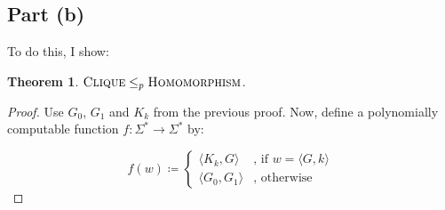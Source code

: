 \documentclass[a4paper,11pt]{scrartcl}
\newcommand{\encode}[1]{\langle #1 \rangle}
\newtheorem{theorem}{Theorem}
\begin{document}
\subsection*{Part (b)}
To do this, I show:
\begin{theorem}
    $\textsc{Clique} \leq_p \textsc{Homomorphism}$.
\end{theorem}
\begin{proof}
    Use $G_0$, $G_1$ and $K_k$ from the previous proof. Now, define a polynomially computable function $f : \Sigma^* \rightarrow \Sigma^*$ by:

    \[
        f(w) \coloneqq
        \begin{cases}
            \encode{K_k, G} & \text{, if } w = \encode{G, k} \\
            \encode{G_0, G_1} & \text{, otherwise}
        \end{cases}
    \]


\end{proof}
\end{document}

